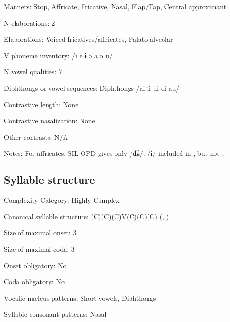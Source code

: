 {\begin{appendixdesc}
\item[Manners:] Stop, Affricate, Fricative, Nasal, Flap/Tap, Central approximant

\item[N elaborations:] 2

\item[Elaborations:] Voiced fricatives/affricates, Palato-alveolar

\item[V phoneme inventory:] /i e ɨ ə a o u/

\item[N vowel qualities:] 7

\item[Diphthongs or vowel sequences:] Diphthongs /ai ɨi ui oi au/

\item[Contrastive length:] None

\item[Contrastive nasalization:] None

\item[Other contrasts:] N/A

\item[Notes:] For affricates, SIL OPD gives only /d͡ʑ/. /ɨ/ included in \citet{Bruce1984}, but not \citet{EdmistonEdmiston2003}.
\end{appendixdesc}
\subsection*{Syllable structure}
\begin{appendixdesc}

\item[Complexity Category:] Highly Complex

\item[Canonical syllable structure:] (C)(C)(C)V(C)(C)(C) (\citealt{Bruce1984}, \citealt{EdmistonEdmiston2003})

\item[Size of maximal onset:] 3

\item[Size of maximal coda:] 3

\item[Onset obligatory:] No

\item[Coda obligatory:] No

\item[Vocalic nucleus patterns:] Short vowels, Diphthongs

\item[Syllabic consonant patterns:] Nasal


\end{appendixdesc}}

